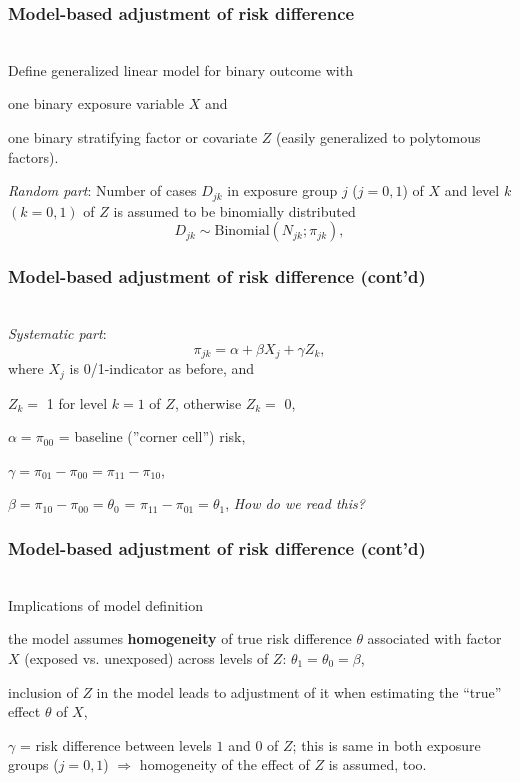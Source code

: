 \documentclass[handout,12pt]{beamer}
\begin{document}

\begin{frame}[fragile] \frametitle{Model-based adjustment of risk difference}
\ \\
Define generalized linear model for binary outcome with
\bi
\item one binary exposure variable $X$ and 
\item
one binary stratifying factor or covariate $Z$ (easily generalized to polytomous factors).
\ei

{\it Random part}: Number of cases $D_{jk}$ in exposure group $j$ ($j=0,1$) of $X$ 
and level $k$ $(k = 0, 1)$ of $Z$ is assumed to be binomially distributed
$$D_{jk} \sim \text{Binomial}(N_{jk} ; \pi_{jk} ) , $$

\end{frame}


\begin{frame}[fragile] \frametitle{Model-based adjustment of risk difference (cont'd)}
\ \\
{\it Systematic part}: 
$$ \pi_{jk} = \alpha + \beta X_j +
  \gamma Z_k  , $$
where $X_j$ is 0/1-indicator as before, and
\bi \item[]
\bi
\item[]$Z_k =$ 1 for level $k=1$ of $Z$, otherwise $Z_k =$ 0,
\item[]$\alpha= \pi_{00}$ = baseline (''corner cell'') risk, 
\item[]$\gamma= \pi_{01}- \pi_{00} = \pi_{11} - \pi_{10}$,
\item[]$\beta= \pi_{10} - \pi_{00} = \theta_0$
                = $\pi_{11} - \pi_{01} = \theta_1$,
\ei
\ei
{\it How do we read this?}

\end{frame} 


\begin{frame}[fragile] \frametitle{Model-based adjustment of risk difference (cont'd)}
\ \\
Implications of model definition
\bi
\item the model assumes {\bf homogeneity} of true risk difference $\theta$ associated with factor $X$ (exposed vs. unexposed) across levels of $Z$: $\theta_1 = \theta_0 = \beta$,
\medskip
\item inclusion of $Z$ in the model leads to adjustment of it when estimating the ``true'' effect $\theta$ of 
      $X$,\medskip
\item $\gamma$ = risk difference between levels $1$ and 0 of $Z$; this
      is same in both exposure groups ($j=0,1$)  \newline
      $\Rightarrow$ homogeneity of the effect of $Z$ is assumed, too.
\ei
\end{frame} 
\end{document}
